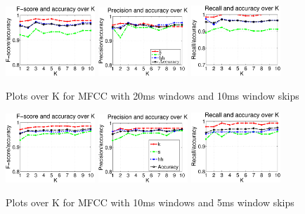 \begin{figure}


	\centering\includegraphics[width=0.3\textwidth]{mfcc2010FP.png}
	\centering\includegraphics[width=0.3\textwidth]{mfcc2010_P.png}
	\centering\includegraphics[width=0.3\textwidth]{mfcc2010_R.png}
	
	\caption{Plots over K for MFCC with 20ms windows and 10ms window skips}
\end{figure}
\begin{figure}


	\centering\includegraphics[width=0.3\textwidth]{mfcc105FP.png}
	\centering\includegraphics[width=0.3\textwidth]{mfcc105_P.png}
	\centering\includegraphics[width=0.3\textwidth]{mfcc105_R.png}
	
	\caption{Plots over K for MFCC with 10ms windows and 5ms window skips}
\end{figure}
